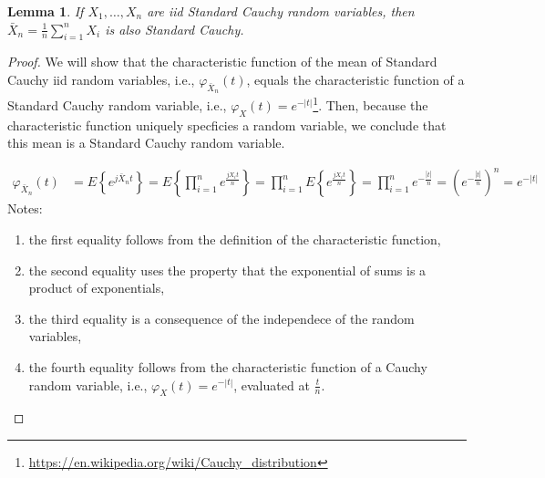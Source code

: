 \documentclass[12pt]{article}
\newtheorem{lemma}{Lemma}
\begin{document}
\begin{appendices}
\begin{figure}[H]
\begin{center}
        \label{fig:cltExamples}

    \end{center}

\end{figure}

\begin{lemma}
    If $X_1,\ldots,X_n$ are iid Standard Cauchy random variables, then
    $\bar{X}_n=\frac{1}{n}\sum_{i=1}^nX_i$ is also Standard Cauchy.
    \label{lemma:samleMeanOfStdCauchyIsStdCauchy}
\end{lemma}
\begin{proof}

    We will show that the characteristic function of the mean of Standard
    Cauchy iid random variables, i.e., $\varphi_{\bar{X}_n}(t)$, equals the
    characteristic function of a Standard Cauchy random variable, i.e.,
    $\varphi_X(t)=e^{-|t|}$\footnote{\url{https://en.wikipedia.org/wiki/Cauchy_distribution}}.
    Then, because the characteristic function uniquely specficies a random
    variable, we conclude that this mean is a Standard Cauchy random variable.

    \begin{align}
        \varphi_{\bar{X}_n}(t)&=E\left\{e^{j\bar{X}_nt}\right\}=E\left\{\prod_{i=1}^ne^{\frac{jX_it}{n}}\right\}=\prod_{i=1}^nE\left\{e^{\frac{jX_it}{n}}\right\}=\prod_{i=1}^ne^{-\frac{|t|}{n}}=\left(e^{-\frac{|t|}{n}}\right)^n=e^{-|t|}
    \end{align}
    Notes:
    \begin{enumerate}

        \item the first equality follows from the definition of the
            characteristic function,

        \item the second equality uses the property that the exponential of
            sums is a product of exponentials,

        \item the third equality is a consequence of the independece of the
            random variables,

        \item the fourth equality follows from the characteristic function of a
            Cauchy random variable, i.e., $\varphi_X(t)=e^{-|t|}$, evaluated at
            $\frac{t}{n}$.
    \end{enumerate}

\end{proof}
\end{appendices}
\end{document}
